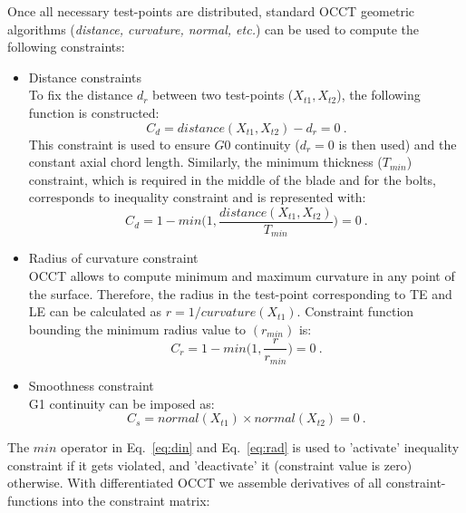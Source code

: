 \documentclass[9pt,academicons]{article}
\begin{document}
Once all necessary test-points are distributed, standard OCCT geometric algorithms (\textit{distance, curvature, normal, etc.}) can be used to compute the following constraints:
\begin{itemize}[itemsep=0em]
\item Distance constraints\\
To fix the distance $d_r$ between two test-points ($X_{t1}, X_{t2}$), the following function is constructed:
\begin{equation}
C_{d} = distance(X_{t1}, X_{t2}) - d_r = 0\:.
\end{equation}
This constraint is used to ensure $G0$  continuity ($d_r = 0$ is then used) and the constant axial chord length. Similarly, the minimum thickness ($T_{min}$) constraint, which is required in the middle of the blade and for the bolts, corresponds to inequality constraint and is represented with:
\begin{equation}
\label{eq:din}
C_{d} = 1 - min\big(1,\frac{distance(X_{t1}, X_{t2})}{T_{min}}\big) = 0\:.
\end{equation}
\item Radius of curvature constraint\\
OCCT allows to compute minimum and maximum curvature in any point of the surface. Therefore, the radius in the test-point corresponding to TE and LE can be calculated as $r = 1/curvature(X_{t1})$. Constraint function bounding the minimum radius value to $(r_{min})$ is:
\begin{equation}
\label{eq:rad}
C_{r} = 1 - min\big(1,\frac{r}{r_{min}}\big) = 0\:.
\end{equation}

\item Smoothness constraint
\\G1 continuity can be imposed as:
\begin{equation}
C_s = normal(X_{t1}) \times normal(X_{t2}) =0 \:. 
\end{equation}
\end{itemize}
The $min$ operator in Eq.~\ref{eq:din} and Eq.~\ref{eq:rad} is used to 'activate' inequality constraint if it gets violated, and 'deactivate' it (constraint value is zero) otherwise. With differentiated OCCT we assemble derivatives of all constraint-functions into the constraint matrix:
\vspace{-1em} 
\newcommand{\myxmatrix}[1]{\ensuremath{\left\downarrow\vphantom{#1}\right.\overset{\xrightarrow[\hphantom{#1}]{\text{\tiny{T}}}}{#1}}}
\end{document}
